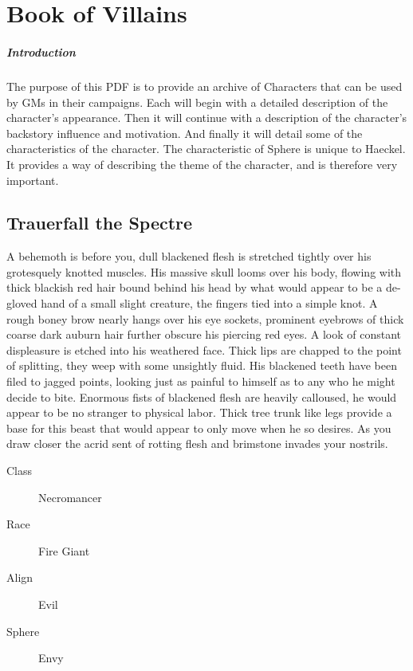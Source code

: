 \chapter{Book of Villains}
\begin{multicols}{2}
\paragraph{Introduction}
The purpose of this PDF is to provide an archive of Characters that can be used by GMs in their campaigns. Each will begin with a detailed description of the character's appearance. Then it will continue with a description of the character's backstory influence and motivation. And finally it will detail some of the characteristics of the character. The characteristic of Sphere is unique to Haeckel. It provides a way of describing the theme of the character, and is therefore very important.

\section{Trauerfall the Spectre}
	A behemoth is before you, dull blackened flesh is stretched tightly over his grotesquely knotted muscles. His massive skull looms over his body, flowing with thick blackish red hair bound behind his head by what would appear to be a de-gloved hand of a small slight creature, the fingers tied into a simple knot. A rough boney brow nearly hangs over his eye sockets, prominent eyebrows of thick coarse dark auburn hair further obscure his piercing red eyes. A look of constant displeasure is etched into his weathered face. Thick lips are chapped to the point of splitting, they weep with some unsightly fluid. His blackened teeth have been filed to jagged points, looking just as painful to himself as to any who he might decide to bite. Enormous fists of blackened flesh are heavily calloused, he would appear to be no stranger to physical labor. Thick tree trunk like legs provide a  base for this beast that would appear to only move when he so desires. As you draw closer the acrid sent of rotting flesh and brimstone invades your nostrils.
\begin{description}
  \item[Class] Necromancer
  \item[Race] Fire Giant
  \item[Align] Evil
  \item[Sphere] Envy
\end{description}


\end{multicols}
